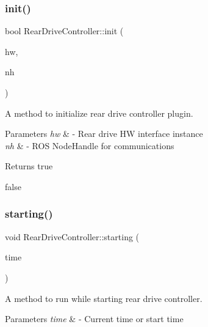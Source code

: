 \subsubsection{\texorpdfstring{init()}{init()}}
{\footnotesize\ttfamily bool Rear\+Drive\+Controller\+::init (\begin{DoxyParamCaption}\item[{\hyperlink{classhardware__interface_1_1RearDriveInterface}{hardware\+\_\+interface\+::\+Rear\+Drive\+Interface} $\ast$}]{hw,  }\item[{ros\+::\+Node\+Handle \&}]{nh }\end{DoxyParamCaption})}



A method to initialize rear drive controller plugin. 


\begin{DoxyParams}{Parameters}
{\em hw} & -\/ Rear drive HW interface instance \\
\hline
{\em nh} & -\/ R\+OS Node\+Handle for communications \\
\hline
\end{DoxyParams}
\begin{DoxyReturn}{Returns}
true 

false 
\end{DoxyReturn}
\mbox{\label{classRearDriveController_a62dd1436e6ad485642378d7cb65b9960}} 
\subsubsection{\texorpdfstring{starting()}{starting()}}
{\footnotesize\ttfamily void Rear\+Drive\+Controller\+::starting (\begin{DoxyParamCaption}\item[{const ros\+::\+Time \&}]{time }\end{DoxyParamCaption})\hspace{0.3cm}{\ttfamily [inline]}}



A method to run while starting rear drive controller. 


\begin{DoxyParams}{Parameters}
{\em time} & -\/ Current time or start time \\
\hline
\end{DoxyParams}
\mbox{\label{classRearDriveController_a1b3be0cdac62e66726dbe0500008de24}} 
